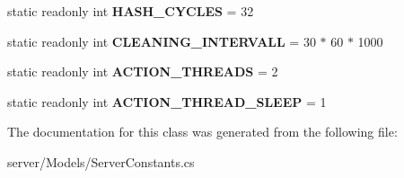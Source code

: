 \begin{DoxyCompactItemize}
\item 
\hypertarget{classServer_1_1Models_1_1ServerConstants_a6b08db695329ec9edee41fa9d4275458}{static readonly int {\bfseries H\-A\-S\-H\-\_\-\-C\-Y\-C\-L\-E\-S} = 32}\label{classServer_1_1Models_1_1ServerConstants_a6b08db695329ec9edee41fa9d4275458}

\item 
\hypertarget{classServer_1_1Models_1_1ServerConstants_a484d3431882413f5a802a5f0ee9f05b9}{static readonly int {\bfseries C\-L\-E\-A\-N\-I\-N\-G\-\_\-\-I\-N\-T\-E\-R\-V\-A\-L\-L} = 30 $\ast$ 60 $\ast$ 1000}\label{classServer_1_1Models_1_1ServerConstants_a484d3431882413f5a802a5f0ee9f05b9}

\item 
\hypertarget{classServer_1_1Models_1_1ServerConstants_a1bfe8a7a369636cf459ee5769273b2b2}{static readonly int {\bfseries A\-C\-T\-I\-O\-N\-\_\-\-T\-H\-R\-E\-A\-D\-S} = 2}\label{classServer_1_1Models_1_1ServerConstants_a1bfe8a7a369636cf459ee5769273b2b2}

\item 
\hypertarget{classServer_1_1Models_1_1ServerConstants_a5e2befbb0254cde1849bcc0a328fb91b}{static readonly int {\bfseries A\-C\-T\-I\-O\-N\-\_\-\-T\-H\-R\-E\-A\-D\-\_\-\-S\-L\-E\-E\-P} = 1}\label{classServer_1_1Models_1_1ServerConstants_a5e2befbb0254cde1849bcc0a328fb91b}

\end{DoxyCompactItemize}


The documentation for this class was generated from the following file\-:\begin{DoxyCompactItemize}
\item 
server/\-Models/Server\-Constants.\-cs\end{DoxyCompactItemize}
